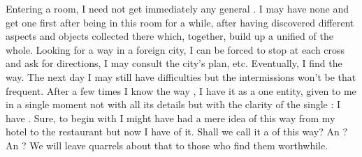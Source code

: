 Entering a room, I need not get immediately any general . I may
have none and get one first after being in this room for a while, after having
discovered different aspects and objects collected there which, together, build
up a unified  of the whole.  Looking for a way in a foreign city,
I can be forced to stop at each cross and ask for directions, I may consult the
city's plan, etc. Eventually, I find the way.  The next day I may still have
difficulties but the intermissions won't be that frequent. After a few times I
know the way , I have it as a one entity, given to me in a single
moment not with all its details but with the clarity of the single :
 I have . Sure, to
begin with I might have had a mere idea of this way from my hotel to the
restaurant but now I have  of it. Shall we call it a
 of this way? An ? An ?
We will leave quarrels about that to those who find them worthwhile. 

